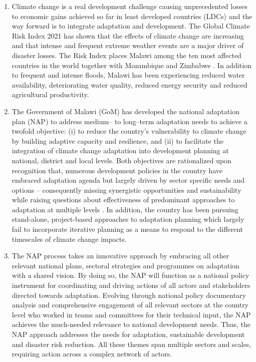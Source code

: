 \documentclass[
]{book}
\begin{document}
\begin{enumerate}
\def\labelenumi{\arabic{enumi}.}
\item
  Climate change is a real development challenge causing unprecedented losses to economic gains achieved so far in least developed countries (LDCs) and the way forward is to integrate adaptation and development. The Global Climate Risk Index 2021 has shown that the effects of climate change are increasing and that intense and frequent extreme weather events are a major driver of disaster losses. The Risk Index places Malawi among the ten most affected countries in the world together with Mozambique and Zimbabwe . In addition to frequent and intense floods, Malawi has been experiencing reduced water availability, deteriorating water quality, reduced energy security and reduced agricultural productivity.
\item
  The Government of Malawi (GoM) has developed the national adaptation plan (NAP) to address medium-- to long--term adaptation needs to achieve a twofold objective: (i) to reduce the country's vulnerability to climate change by building adaptive capacity and resilience, and (ii) to facilitate the integration of climate change adaptation into development planning at national, district and local levels. Both objectives are rationalized upon recognition that, numerous development policies in the country have embraced adaptation agenda but largely driven by sector specific needs and options -- consequently missing synergistic opportunities and sustainability while raising questions about effectiveness of predominant approaches to adaptation at multiple levels . In addition, the country has been pursuing stand-alone, project-based approaches to adaptation planning which largely fail to incorporate iterative planning as a means to respond to the different timescales of climate change impacts.
\item
  The NAP process takes an innovative approach by embracing all other relevant national plans, sectoral strategies and programmes on adaptation with a shared vision. By doing so, the NAP will function as a national policy instrument for coordinating and driving actions of all actors and stakeholders directed towards adaptation. Evolving through national policy documentary analysis and comprehensive engagement of all relevant sectors at the country level who worked in teams and committees for their technical input, the NAP achieves the much-needed relevance to national development needs. Thus, the NAP approach addresses the needs for adaptation, sustainable development and disaster risk reduction. All these themes span multiple sectors and scales, requiring action across a complex network of actors.

\end{enumerate}
\end{document}
